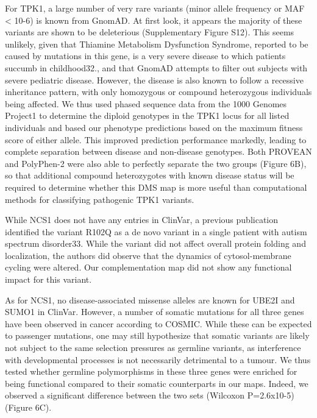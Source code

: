 For TPK1, a large number of very rare variants (minor allele frequency or MAF < 10-6) is known from GnomAD. At first look, it appears the majority of these variants are shown to be deleterious (Supplementary Figure S12). This seems unlikely, given that Thiamine Metabolism Dysfunction Syndrome, reported to be caused by mutations in this gene, is a very severe disease to which patients succumb in childhood32., and that GnomAD attempts to filter out subjects with severe pediatric disease. However, the disease is also known to follow a recessive inheritance pattern, with only homozygous or compound heterozygous individuals being affected. We thus used phased sequence data from the 1000 Genomes Project1 to determine the diploid genotypes in the TPK1 locus for all listed individuals and based our phenotype predictions based on the maximum fitness score of either allele. This improved prediction performance markedly, leading to complete separation between disease and non-disease genotypes. Both PROVEAN and PolyPhen-2 were also able to perfectly separate the two groups (Figure 6B), so that additional compound heterozygotes with known disease status will be required to determine whether this DMS map is more useful than computational methods for classifying pathogenic TPK1 variants. 

While NCS1 does not have any entries in ClinVar, a previous publication identified the variant R102Q as a de novo variant in a single patient with autism spectrum disorder33. While the variant did not affect overall protein folding and localization, the authors did observe that the dynamics of cytosol-membrane cycling were altered. Our complementation map did not show any functional impact for this variant.

As for NCS1, no disease-associated missense alleles are known for UBE2I and SUMO1 in ClinVar. However, a number of somatic mutations for all three genes have been observed in cancer according to COSMIC. While these can be expected to passenger mutations, one may still hypothesize that somatic variants are likely not subject to the same selection pressures as germline variants, as interference with developmental processes is not necessarily detrimental to a tumour. We thus tested whether germline polymorphisms in these three genes were enriched for being functional compared to their somatic counterparts in our maps. Indeed, we observed a significant difference between the two sets (Wilcoxon P=2.6x10-5) (Figure 6C).

